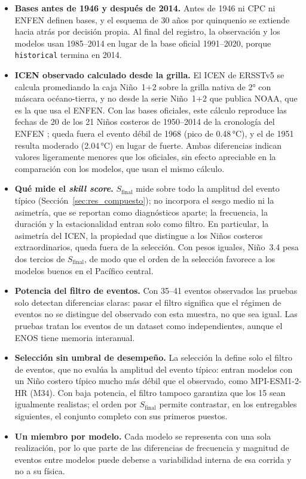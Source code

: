 \documentclass[11pt,a4paper]{article}
\begin{document}
\begin{itemize}[nosep]
\item \textbf{Bases antes de 1946 y después de 2014.} Antes de 1946 ni CPC ni ENFEN definen bases, y el esquema de 30 años por quinquenio se extiende hacia atrás por decisión propia. Al final del registro, la observación y los modelos usan 1985--2014 en lugar de la base oficial 1991--2020, porque \texttt{historical} termina en 2014.
\item \textbf{ICEN observado calculado desde la grilla.} El ICEN de ERSSTv5 se calcula promediando la caja Niño~1+2 sobre la grilla nativa de 2° con máscara océano-tierra, y no desde la serie Niño~1+2 que publica NOAA, que es la que usa el ENFEN. Con las bases oficiales, este cálculo reproduce las fechas de 20 de los 21 Niños costeros de 1950--2014 de la cronología del ENFEN \citep{enfen2024}; queda fuera el evento débil de 1968 (pico de 0.48\,°C), y el de 1951 resulta moderado (2.04\,°C) en lugar de fuerte. Ambas diferencias indican valores ligeramente menores que los oficiales, sin efecto apreciable en la comparación con los modelos, que usan el mismo cálculo.
\item \textbf{Qué mide el \emph{skill score}.} $S_{\mathrm{final}}$ mide sobre todo la amplitud del evento típico (Sección~\ref{sec:res_compuesto}); no incorpora el sesgo medio ni la asimetría, que se reportan como diagnósticos aparte; la frecuencia, la duración y la estacionalidad entran solo como filtro. En particular, la asimetría del ICEN, la propiedad que distingue a los Niños costeros extraordinarios, queda fuera de la selección. Con pesos iguales, Niño~3.4 pesa dos tercios de $S_{\mathrm{final}}$, de modo que el orden de la selección favorece a los modelos buenos en el Pacífico central.
\item \textbf{Potencia del filtro de eventos.} Con 35--41 eventos observados las pruebas solo detectan diferencias claras: pasar el filtro significa que el régimen de eventos no se distingue del observado con esta muestra, no que sea igual. Las pruebas tratan los eventos de un dataset como independientes, aunque el ENOS tiene memoria interanual.
\item \textbf{Selección sin umbral de desempeño.} La selección la define solo el filtro de eventos, que no evalúa la amplitud del evento típico: entran modelos con un Niño costero típico mucho más débil que el observado, como MPI-ESM1-2-HR (M34). Con baja potencia, el filtro tampoco garantiza que los 15 sean igualmente realistas; el orden por $S_{\mathrm{final}}$ permite contrastar, en los entregables siguientes, el conjunto completo con sus primeros puestos.
\item \textbf{Un miembro por modelo.} Cada modelo se representa con una sola realización, por lo que parte de las diferencias de frecuencia y magnitud de eventos entre modelos puede deberse a variabilidad interna de esa corrida y no a su física.
\end{itemize}
\end{document}
